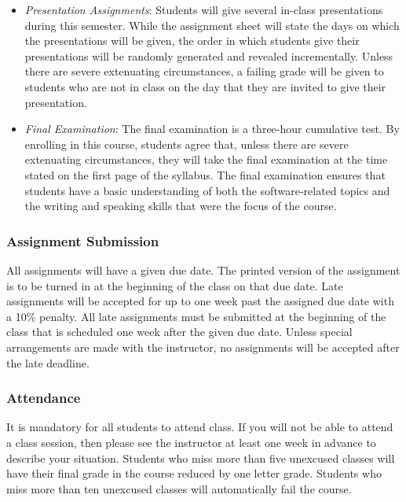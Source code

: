 \begin{itemize}
  \item {\em Presentation Assignments}: Students will give several in-class presentations during this semester. While
    the assignment sheet will state the days on which the presentations will be given, the order in which students
    give their presentations will be randomly generated and revealed incrementally.  Unless there are severe
    extenuating circumstances, a failing grade will be given to students who are not in class on the day that they
    are invited to give their presentation.

  \item {\em Final Examination}: The final examination is a three-hour cumulative test.  By enrolling in this course,
    students agree that, unless there are severe extenuating circumstances, they will take the final examination at
    the time stated on the first page of the syllabus.  The final examination ensures that students have a basic
    understanding of both the software-related topics and the writing and speaking skills that were the focus of the
    course.

\end{itemize}
\vspace*{-.2in}

\subsubsection*{Assignment Submission}

All assignments will have a given due date.  The printed version of the assignment is to be turned in at the beginning
of the class on that due date.  Late assignments will be accepted for up to one week past the assigned due date with a
10\% penalty.  All late assignments must be submitted at the beginning of the class that is scheduled one week after the
given due date.  Unless special arrangements are made with the instructor, no assignments will be accepted after the
late deadline.

\subsubsection*{Attendance}

It is mandatory for all students to attend class.  If you will not be able to attend a class session, then please see
the instructor at least one week in advance to describe your situation.  Students who miss more than five unexcused
classes will have their final grade in the course reduced by one letter grade.  Students who miss more than ten
unexcused classes will automatically fail the course.

